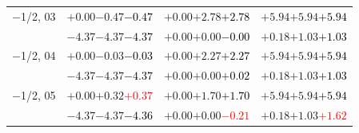 \documentclass[compress]{beamer}
\begin{document}
\begin{frame}
\begin{tabular}{r | c | c | c}
$-$1/2, 03 & $+0.00$\hspace{0.1 cm}$-0.47$\hspace{0.1 cm}\textcolor{black}{$-0.47$} & $+0.00$\hspace{0.1 cm}$+2.78$\hspace{0.1 cm}\textcolor{black}{$+2.78$} & $+5.94$\hspace{0.1 cm}$+5.94$\hspace{0.1 cm}\textcolor{black}{$+5.94$} \\
           & $-4.37$\hspace{0.1 cm}$-4.37$\hspace{0.1 cm}\textcolor{black}{$-4.37$} & $+0.00$\hspace{0.1 cm}$+0.00$\hspace{0.1 cm}\textcolor{black}{$-0.00$} & $+0.18$\hspace{0.1 cm}$+1.03$\hspace{0.1 cm}\textcolor{black}{$+1.03$} \\
$-$1/2, 04 & $+0.00$\hspace{0.1 cm}$-0.03$\hspace{0.1 cm}\textcolor{black}{$-0.03$} & $+0.00$\hspace{0.1 cm}$+2.27$\hspace{0.1 cm}\textcolor{black}{$+2.27$} & $+5.94$\hspace{0.1 cm}$+5.94$\hspace{0.1 cm}\textcolor{black}{$+5.94$} \\
           & $-4.37$\hspace{0.1 cm}$-4.37$\hspace{0.1 cm}\textcolor{black}{$-4.37$} & $+0.00$\hspace{0.1 cm}$+0.00$\hspace{0.1 cm}\textcolor{black}{$+0.02$} & $+0.18$\hspace{0.1 cm}$+1.03$\hspace{0.1 cm}\textcolor{black}{$+1.03$} \\
$-$1/2, 05 & $+0.00$\hspace{0.1 cm}$+0.32$\hspace{0.1 cm}\textcolor{red}{$+0.37$} & $+0.00$\hspace{0.1 cm}$+1.70$\hspace{0.1 cm}\textcolor{black}{$+1.70$} & $+5.94$\hspace{0.1 cm}$+5.94$\hspace{0.1 cm}\textcolor{black}{$+5.94$} \\
           & $-4.37$\hspace{0.1 cm}$-4.37$\hspace{0.1 cm}\textcolor{black}{$-4.36$} & $+0.00$\hspace{0.1 cm}$+0.00$\hspace{0.1 cm}\textcolor{red}{$-0.21$} & $+0.18$\hspace{0.1 cm}$+1.03$\hspace{0.1 cm}\textcolor{red}{$+1.62$} \\

\end{tabular}
\end{frame}
\end{document}
